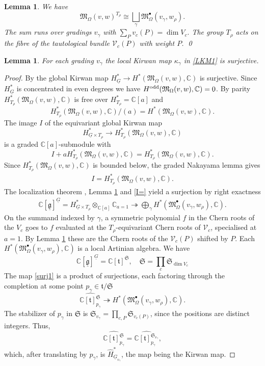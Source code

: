 \documentclass[11pt,reqno]{amsart}
\newtheorem{Lemma}[Theorem]{Lemma}
\theoremstyle{definition}
\theoremstyle{remark}
\def\bbC{\mathbb C}
\def\dG{\underline G}
\def\dg{\underline{\mathfrak g}}
\def\calV{\mathcal V}
\def\M{\mathfrak M}
\begin{document}
\begin{Lemma}\label{lem:fixed}
We have 
$$\M_\Omega(v,w)^{T_\rho}\cong\bigsqcup_\gamma\M_\Omega^\bullet(v_\gamma,w_\rho).$$
The sum runs over  gradings $v_\gamma$ with $\sum_Pv_c(P)=\dim V_c.$ 
The group $T_\rho$ acts on the fibre of the
tautological bundle $\calV_c(P)$ with weight $P$. 
\qed
\end{Lemma}



\begin{Lemma}\label{lem:kirwan}
For each grading $v_\gamma$ the local Kirwan map $\kappa_\gamma$ in \eqref{LKM1} is surjective. 
\end{Lemma}

\begin{proof}
By \cite{MN18} the global Kirwan map $H^*_{\dG}\to H^*(\M_\Omega(v,w),\bbC)$ is surjective. 
Since $H^*_{\dG}$ is concentrated in even degrees we have $H^{\rm odd}(\M_\Omega(v,w),\bbC)=0$.
By parity $H^*_{T_\rho}(\M_\Omega(v,w),\bbC)$ is free over $H^*_{T_\rho}=\bbC[a]$ and
$$H^*_{T_\rho}(\M_\Omega(v,w),\bbC)/(a)=H^*(\M_\Omega(v,w),\bbC).$$
The image $I$ of the equivariant global Kirwan map 
$$H^*_{\dG\times T_\rho}\to H^*_{T_\rho}(\M_\Omega(v,w),\bbC)$$ is a graded $\bbC[a]$-submodule with 
$$I+aH^*_{T_\rho}(\M_\Omega(v,w),\bbC)=H^*_{T_\rho}(\M_\Omega(v,w),\bbC).$$
Since
$H^*_{T_\rho}(\M_\Omega(v,w),\bbC)$ is bounded below, the graded Nakayama lemma gives 
\begin{align}\label{I=}I=H^*_{T_\rho}(\M_\Omega(v,w),\bbC).\end{align}
The localization theorem \cite{Qui71}, Lemma \ref{lem:fixed} and \eqref{I=} yield a surjection by right exactness
\begin{align}\label{surj1}
\bbC[\dg]^{\dG}=H^*_{\dG\times T_\rho}\otimes_{\bbC[a]}\bbC_{a=1}\twoheadrightarrow
\textstyle\bigoplus_\gamma H^*(\M_\Omega^\bullet(v_\gamma,w_\rho),\bbC).
\end{align}
On the summand indexed by $\gamma$, a symmetric polynomial $f$ in the Chern roots of the $V_c$ 
goes to $f$ evaluated at the $T_\rho$-equivariant Chern
roots of $\calV_c$, specialised at $a=1$.
By Lemma \ref{lem:fixed} these are the Chern roots of the $\calV_c(P)$ shifted by $P$. 
Each $H^*(\M_\Omega^\bullet(v_\gamma,w_\rho),\bbC)$ is a local Artinian algebra. We have 
$$\bbC[\dg]^{\dG}=\bbC[\mathfrak t]^{\mathfrak S},\quad \mathfrak S=\prod_c\mathfrak S_{\dim V_c}$$ 
The map \eqref{surj1} is a product of surjections, each factoring through the completion at some point 
$p_\gamma\in\mathfrak t/\mathfrak S$
\[
\widehat{\bbC[\mathfrak t]^{\mathfrak S}_{p_\gamma}}\twoheadrightarrow H^*(\M_\Omega^\bullet(v_\gamma,w_\rho),\bbC).
\]
The stabilizer of $p_\gamma$ in $\mathfrak S$ is $\mathfrak S_{v_\gamma}=\prod_{c,P}\mathfrak S_{v_c(P)}$,
since the positions are distinct integers.
Thus,
$$\widehat{\bbC[\mathfrak t]^{\mathfrak S}_{p_\gamma}}=\widehat{\bbC[\mathfrak t]^{\mathfrak S_{v_\gamma}}_{p_\gamma}},$$ 
which, after translating by $p_\gamma$, is $\widehat H^*_{\dG_{v_\gamma}}$, the map being the
Kirwan map. 
\end{proof}
\end{document}
